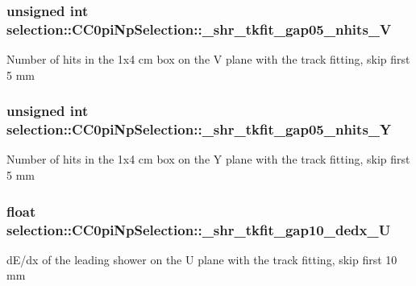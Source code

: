 \subsubsection[{\texorpdfstring{\+\_\+shr\+\_\+tkfit\+\_\+gap05\+\_\+nhits\+\_\+V}{_shr_tkfit_gap05_nhits_V}}]{\setlength{\rightskip}{0pt plus 5cm}unsigned int selection\+::\+C\+C0pi\+Np\+Selection\+::\+\_\+shr\+\_\+tkfit\+\_\+gap05\+\_\+nhits\+\_\+V\hspace{0.3cm}{\ttfamily [private]}}\hypertarget{classselection_1_1CC0piNpSelection_a515d1b21ecb57c0177501823b5ec2568}{}\label{classselection_1_1CC0piNpSelection_a515d1b21ecb57c0177501823b5ec2568}
Number of hits in the 1x4 cm box on the V plane with the track fitting, skip first 5 mm 
\subsubsection[{\texorpdfstring{\+\_\+shr\+\_\+tkfit\+\_\+gap05\+\_\+nhits\+\_\+Y}{_shr_tkfit_gap05_nhits_Y}}]{\setlength{\rightskip}{0pt plus 5cm}unsigned int selection\+::\+C\+C0pi\+Np\+Selection\+::\+\_\+shr\+\_\+tkfit\+\_\+gap05\+\_\+nhits\+\_\+Y\hspace{0.3cm}{\ttfamily [private]}}\hypertarget{classselection_1_1CC0piNpSelection_a91054bcbcb38dd0684fe810167c7146f}{}\label{classselection_1_1CC0piNpSelection_a91054bcbcb38dd0684fe810167c7146f}
Number of hits in the 1x4 cm box on the Y plane with the track fitting, skip first 5 mm 
\subsubsection[{\texorpdfstring{\+\_\+shr\+\_\+tkfit\+\_\+gap10\+\_\+dedx\+\_\+U}{_shr_tkfit_gap10_dedx_U}}]{\setlength{\rightskip}{0pt plus 5cm}float selection\+::\+C\+C0pi\+Np\+Selection\+::\+\_\+shr\+\_\+tkfit\+\_\+gap10\+\_\+dedx\+\_\+U\hspace{0.3cm}{\ttfamily [private]}}\hypertarget{classselection_1_1CC0piNpSelection_a3b32a837b2388327cee3eb07ad25a557}{}\label{classselection_1_1CC0piNpSelection_a3b32a837b2388327cee3eb07ad25a557}
d\+E/dx of the leading shower on the U plane with the track fitting, skip first 10 mm 
